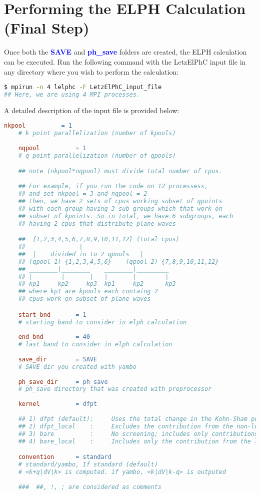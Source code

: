 \documentclass[12pt,twoside,openany]{book}
\begin{document}
\section{Performing the ELPH Calculation (Final Step)}
Once both the \textcolor{blue}{\bf{SAVE}} and \textcolor{blue}{\bf{ph\_save}} folders are created, 
the ELPH calculation can be executed. Run the following command with the LetzElPhC input file in any 
directory where you wish to perform the calculation:
\begin{lstlisting}[language=bash]
$ mpirun -n 4 lelphc -F LetzElPhC_input_file
## Here, we are using 4 MPI processes.
\end{lstlisting}
A detailed description of the input file is provided below:
\begin{lstlisting}[language=make]
    nkpool          = 1 
    # k point parallelization (number of kpools)
    
    nqpool          = 1
    # q point parallelization (number of qpools)

    ## note (nkpool*nqpool) must divide total number of cpus.
    
    ## For example, if you run the code on 12 processess, 
    ## and set nkpool = 3 and nqpool = 2
    ## then, we have 2 sets of cpus working subset of qpoints 
    ## with each group having 3 sub groups which that work on 
    ## subset of kpoints. So in total, we have 6 subgroups, each 
    ## having 2 cpus that distribute plane waves 

    ##  {1,2,3,4,5,6,7,8,9,10,11,12} (total cpus)
    ##   ____________|________________
    ##  |    divided in to 2 qpools   |
    ## (qpool 1) {1,2,3,4,5,6}    (qpool 2) {7,8,9,10,11,12}
    ## ________|________    ________|_________
    ## |        |       |   |       |        |
    ## kp1     kp2     kp3  kp1     kp2      kp3
    ## where kp1 are kpools each containg 2 
    ## cpus work on subset of plane waves

    start_bnd       = 1
    # starting band to consider in elph calculation
    
    end_bnd         = 40
    # last band to consider in elph calculation
    
    save_dir        = SAVE
    # SAVE dir you created with yambo
    
    ph_save_dir     = ph_save
    # ph_save directory that was created with preprocessor
    
    kernel          = dfpt
    
    ## 1) dfpt (default):     Uses the total change in the Kohn-Sham potential (DFPT screening).
    ## 2) dfpt_local    :     Excludes the contribution from the non-local part of the pseudopotentials (p.p.).
    ## 3) bare          :     No screening; includes only contributions from the local and non-local parts of the pseudopotentials.
    ## 4) bare_local    :     Includes only the contribution from the local part of the pseudopotential.

    convention      = standard 
    # standard/yambo, If standard (default) 
    # <k+q|dV|k> is computed. if yambo, <k|dV|k-q> is outputed 
    
    ###  ##, !, ; are considered as comments
\end{lstlisting}
\end{document}
